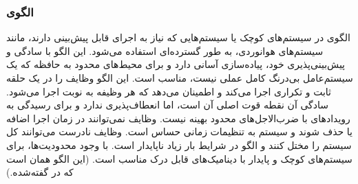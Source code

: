 \subsubsection{الگوی }
\label{archConCyclicExecSec}
\begin{RTL}
الگوی  در سیستم‌های کوچک
یا سیستم‌هایی که نیاز به اجرای قابل پیش‌بینی دارند،
مانند سیستم‌های هوانوردی، به طور گسترده‌ای استفاده می‌شود.
این الگو با سادگی و پیش‌بینی‌پذیری خود، پیاده‌سازی آسانی دارد و برای محیط‌های محدود به
حافظه که یک سیستم‌عامل بی‌درنگ کامل عملی نیست، مناسب است. این الگو وظایف
را در یک حلقه ثابت و تکراری اجرا می‌کند و اطمینان می‌دهد که هر
وظیفه به نوبت اجرا می‌شود. سادگی آن نقطه قوت اصلی آن
است، اما انعطاف‌پذیری ندارد و برای رسیدگی به رویدادهای با ضرب‌الاجل‌های
محدود بهینه نیست. وظایف نمی‌توانند در زمان اجرا اضافه یا
حذف شوند و سیستم به تنظیمات زمانی حساس است.
وظایف نادرست می‌توانند کل سیستم را مختل کنند و
الگو در شرایط بار زیاد ناپایدار است. با وجود محدودیت‌ها، برای
سیستم‌های کوچک و پایدار با دینامیک‌های قابل درک مناسب است.
(این الگو همان  است که
در \cite{ref1} گفته‌شده.)
\end{RTL}